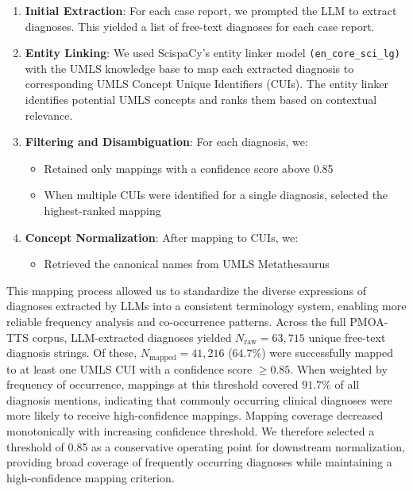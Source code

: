 \begin{enumerate}
    \item \textbf{Initial Extraction}: For each case report, we prompted the LLM to extract diagnoses. 
    This yielded a list of free-text diagnoses for each case report.
    \item \textbf{Entity Linking}: We used ScispaCy's entity linker model 
    \texttt{(en\_core\_sci\_lg)} with the UMLS knowledge base to map each extracted diagnosis to corresponding UMLS Concept Unique Identifiers (CUIs). 
    The entity linker identifies potential UMLS concepts and ranks them based on contextual relevance.
    \item \textbf{Filtering and Disambiguation}: For each diagnosis, we:
    \begin{itemize}
       \item Retained only mappings with a confidence score above 0.85
       \item When multiple CUIs were identified for a single diagnosis, selected the highest-ranked mapping
    \end{itemize}
    \item \textbf{Concept Normalization}: After mapping to CUIs, we:
\begin{itemize}
   \item Retrieved the canonical names from UMLS Metathesaurus
\end{itemize}
\end{enumerate}



This mapping process allowed us to standardize the diverse expressions of diagnoses extracted by LLMs into a consistent terminology system, enabling more reliable frequency analysis and co-occurrence patterns. 
Across the full PMOA-TTS corpus, LLM-extracted diagnoses yielded
$N_{\text{raw}} = 63{,}715$ unique free-text diagnosis strings.
Of these, $N_{\text{mapped}} = 41{,}216$ ($64.7\%$) were successfully mapped to at least one
UMLS CUI with a confidence score $\ge 0.85$.
When weighted by frequency of occurrence, mappings at this threshold covered
$91.7\%$ of all diagnosis mentions, indicating that commonly occurring clinical
diagnoses were more likely to receive high-confidence mappings.
Mapping coverage decreased monotonically with increasing confidence threshold.
We therefore selected a threshold of 0.85 as a conservative operating point for
downstream normalization, providing broad coverage of frequently occurring diagnoses
while maintaining a high-confidence mapping criterion.


